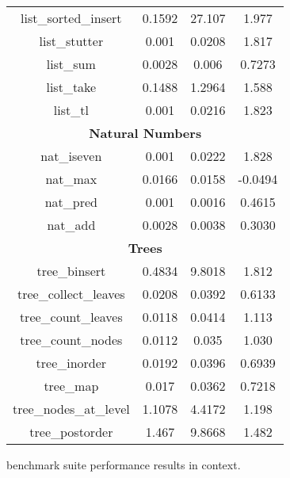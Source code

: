 \begin{figure}
\begin{center}
\begin{tabular}{cccc}
list\_sorted\_insert & 0.1592 & 27.107 & 1.977 \\
list\_stutter & 0.001 & 0.0208 & 1.817 \\
list\_sum & 0.0028 & 0.006 & 0.7273 \\
list\_take & 0.1488 & 1.2964 & 1.588 \\
list\_tl & 0.001 & 0.0216 & 1.823 \\
\multicolumn{4}{c}{\textbf{Natural Numbers}} \\
nat\_iseven & 0.001 & 0.0222 & 1.828 \\
nat\_max & 0.0166 & 0.0158 & -0.0494 \\
nat\_pred & 0.001 & 0.0016 & 0.4615 \\
nat\_add & 0.0028 & 0.0038 & 0.3030 \\
\multicolumn{4}{c}{\textbf{Trees}} \\
tree\_binsert & 0.4834 & 9.8018 & 1.812 \\
tree\_collect\_leaves & 0.0208 & 0.0392 & 0.6133 \\
tree\_count\_leaves & 0.0118 & 0.0414 & 1.113 \\
tree\_count\_nodes & 0.0112 & 0.035 & 1.030 \\
tree\_inorder & 0.0192 & 0.0396 & 0.6939 \\
tree\_map & 0.017 & 0.0362 & 0.7218 \\
tree\_nodes\_at\_level & 1.1078 & 4.4172 & 1.198 \\
tree\_postorder & 1.467 & 9.8668 & 1.482 \\

  \hline
  \end{tabular}
  \end{center}
  \caption[\myth{} benchmark suite performance results in context]{%
    \myth{} benchmark suite performance results in context.
  }
  \label{tbl:myth-raw-context}
\end{figure}
